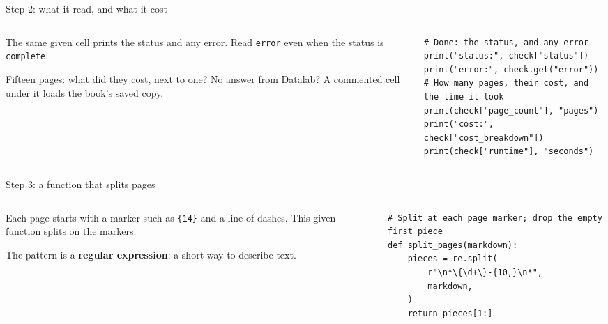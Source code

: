 \documentclass[9pt,aspectratio=169]{beamer}
\begin{document}
\begin{frame}[fragile]{Step 2: what it read, and what it cost}
    \begin{columns}[T]
        \begin{column}{0.37\textwidth}
            The same given cell prints the status and any error. Read \texttt{error} even when the status is \texttt{complete}.

            \medskip
            Fifteen pages: what did they cost, next to one? No answer from Datalab? A commented cell under it loads the book's saved copy.
        \end{column}
        \begin{column}{0.6\textwidth}
\begin{lstlisting}
# Done: the status, and any error
print("status:", check["status"])
print("error:", check.get("error"))
# How many pages, their cost, and the time it took
print(check["page_count"], "pages")
print("cost:", check["cost_breakdown"])
print(check["runtime"], "seconds")
\end{lstlisting}
        \end{column}
    \end{columns}
\end{frame}

\begin{frame}[fragile]{Step 3: a function that splits pages}
    \begin{columns}[T]
        \begin{column}{0.37\textwidth}
            Each page starts with a marker such as \texttt{\{14\}} and a line of dashes. This given function splits on the markers.

            \medskip
            The pattern is a \textbf{regular expression}: a short way to describe text.
        \end{column}
        \begin{column}{0.6\textwidth}
\begin{lstlisting}
# Split at each page marker; drop the empty first piece
def split_pages(markdown):
    pieces = re.split(
        r"\n*\{\d+\}-{10,}\n*",
        markdown,
    )
    return pieces[1:]
\end{lstlisting}
        \end{column}
    \end{columns}
\end{frame}
\end{document}

